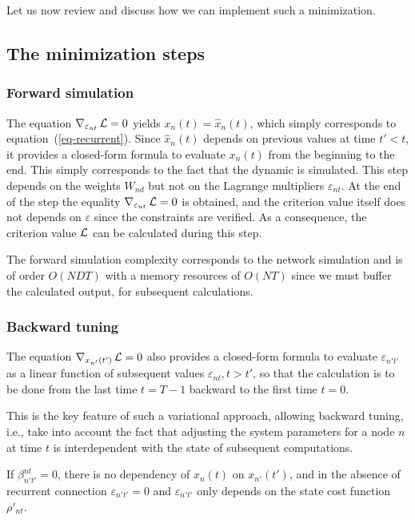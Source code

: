Let us now review and discuss how we can implement such a minimization.

\subsection*{The minimization steps}

\subsubsection*{Forward simulation}

The equation $\nabla_{\varepsilon_{nt}} \, {\cal L} = 0$ yields $x_n(t) = \hat{x}_n(t)$, which simply corresponds to equation~(\ref{eq-recurrent}). Since $\hat{x}_n(t)$ depends on previous values at time $t' < t$, it provides a closed-form formula to evaluate $x_n(t)$ from the beginning to the end. This simply corresponds to the fact that the dynamic is simulated. This step depends on the weights $W_{nd}$ but not on the Lagrange multipliers $\varepsilon_{nt}$. At the end of the step the equality $\nabla_{\varepsilon_{nt}} \, {\cal L} = 0$ is obtained, and the criterion value itself does not depends on $\varepsilon$ since the constraints are verified. As a consequence, the criterion value ${\cal L}$ can be calculated during this step.

The forward simulation complexity corresponds to the network simulation and is of order $O(N D T)$ with a memory resources of $O(N T)$ since we must buffer the calculated output,  for subsequent calculations.

\subsubsection*{Backward tuning}

The equation $\nabla_{x_{n'}(t')} \, {\cal L}  = 0$ also provides a closed-form formula to evaluate $\varepsilon_{n't'}$ as a linear function of subsequent values $\varepsilon_{nt}, t > t'$, so that the calculation is to be done from the last time $t = T-1$ backward to the first time $t = 0$.

This is the key feature of such a variational approach, allowing backward tuning, i.e., take into account the fact that adjusting the system parameters for a node $n$ at time $t$ is interdependent with the state of subsequent computations.

If $\beta_{n't'}^{nt} = 0$, there is no dependency of ${x}_n(t)$ on ${x}_{n'}(t')$, and in the absence of recurrent connection $\varepsilon_{n't'} = 0$ and $\varepsilon_{n't'}$ only depends on the state cost function $\rho'_{nt}$.

